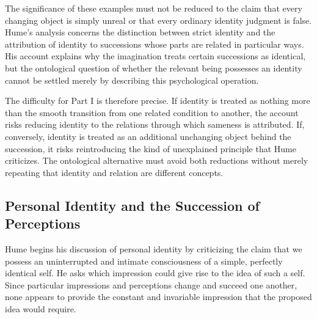 \label{para:VS.B01.P01.C08.S09.SS06.P005}

The significance of these examples must not be
reduced to the claim that every changing object
is simply unreal or that every ordinary identity
judgment is false. Hume's analysis concerns the
distinction between strict identity and the
attribution of identity to successions whose parts
are related in particular ways. His account explains
why the imagination treats certain successions
as identical, but the ontological question of
whether the relevant being possesses an identity
cannot be settled merely by describing this
psychological operation.

\label{para:VS.B01.P01.C08.S09.SS06.P006}

The difficulty for Part I is therefore precise.
If identity is treated as nothing more than the
smooth transition from one related condition to
another, the account risks reducing identity to
the relations through which sameness is attributed.
If, conversely, identity is treated as an additional
unchanging object behind the succession, it risks
reintroducing the kind of unexplained principle
that Hume criticizes. The ontological alternative
must avoid both reductions without merely repeating
that identity and relation are different concepts.



\subsection{Personal Identity and the Succession of Perceptions}
\label{subsec:ch08-hume-personal-identity}

\label{para:VS.B01.P01.C08.S09.SS07.P001}

Hume begins his discussion of personal identity by
criticizing the claim that we possess an uninterrupted
and intimate consciousness of a simple, perfectly
identical self. He asks which impression could give
rise to the idea of such a self. Since particular
impressions and perceptions change and succeed one
another, none appears to provide the constant and
invariable impression that the proposed idea would
require.
\cite[1.4.6.1--3, SBN 251--252]{HumeTreatise}

